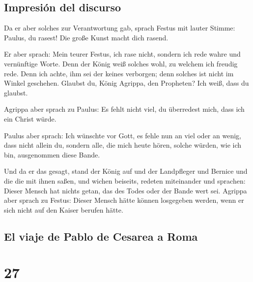 \hypertarget{impresiuxf3n-del-discurso}{%
\subsection{Impresión del discurso}\label{impresiuxf3n-del-discurso}}

 Da er aber solches zur Verantwortung gab, sprach Festus
mit lauter Stimme: Paulus, du rasest! Die große Kunst macht dich rasend.

 Er aber sprach: Mein teurer Festus, ich rase nicht,
sondern ich rede wahre und vernünftige Worte.  Denn der
König weiß solches wohl, zu welchem ich freudig rede. Denn ich achte,
ihm sei der keines verborgen; denn solches ist nicht im Winkel
geschehen.  Glaubst du, König Agrippa, den Propheten? Ich
weiß, dass du glaubst.

 Agrippa aber sprach zu Paulus: Es fehlt nicht viel, du
überredest mich, dass ich ein Christ würde.

 Paulus aber sprach: Ich wünschte vor Gott, es fehle nun
an viel oder an wenig, dass nicht allein du, sondern alle, die mich
heute hören, solche würden, wie ich bin, ausgenommen diese Bande.

 Und da er das gesagt, stand der König auf und der
Landpfleger und Bernice und die die mit ihnen saßen,  und
wichen beiseits, redeten miteinander und sprachen: Dieser Mensch hat
nichts getan, das des Todes oder der Bande wert sei. 
Agrippa aber sprach zu Festus: Dieser Mensch hätte können losgegeben
werden, wenn er sich nicht auf den Kaiser berufen hätte.

\hypertarget{el-viaje-de-pablo-de-cesarea-a-roma}{%
\subsection{El viaje de Pablo de Cesarea a
Roma}\label{el-viaje-de-pablo-de-cesarea-a-roma}}

\hypertarget{section-26}{%
\section{27}\label{section-26}}


